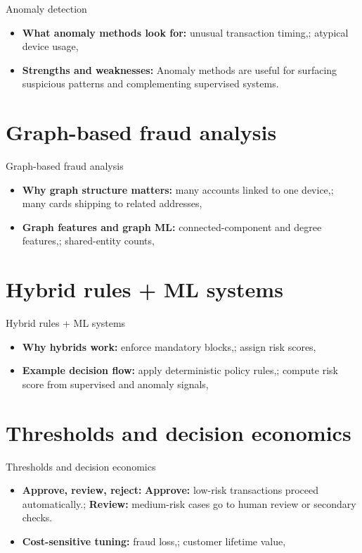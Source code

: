 \documentclass[aspectratio=169]{beamer}
\begin{document}
\begin{frame}{Anomaly detection}
  \begin{itemize}
    \item \textbf{What anomaly methods look for:} unusual transaction timing,; atypical device usage,
    \item \textbf{Strengths and weaknesses:} Anomaly methods are useful for surfacing suspicious patterns and complementing supervised systems.
  \end{itemize}
\end{frame}

\section{Graph-based fraud analysis}

\begin{frame}{Graph-based fraud analysis}
  \begin{itemize}
    \item \textbf{Why graph structure matters:} many accounts linked to one device,; many cards shipping to related addresses,
    \item \textbf{Graph features and graph ML:} connected-component and degree features,; shared-entity counts,
  \end{itemize}
\end{frame}

\section{Hybrid rules + ML systems}

\begin{frame}{Hybrid rules + ML systems}
  \begin{itemize}
    \item \textbf{Why hybrids work:} enforce mandatory blocks,; assign risk scores,
    \item \textbf{Example decision flow:} apply deterministic policy rules,; compute risk score from supervised and anomaly signals,
  \end{itemize}
\end{frame}

\section{Thresholds and decision economics}

\begin{frame}{Thresholds and decision economics}
  \begin{itemize}
    \item \textbf{Approve, review, reject:} \textbf{Approve:} low-risk transactions proceed automatically.; \textbf{Review:} medium-risk cases go to human review or secondary checks.
    \item \textbf{Cost-sensitive tuning:} fraud loss,; customer lifetime value,
  \end{itemize}
\end{frame}
\end{document}
